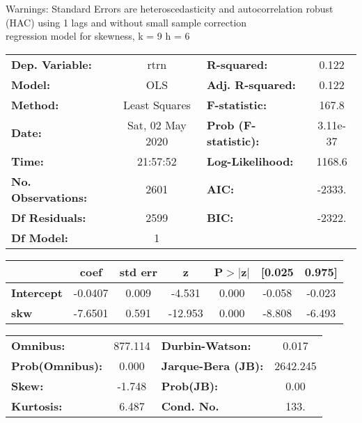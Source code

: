 Warnings: \newline
 [1] Standard Errors are heteroscedasticity and autocorrelation robust (HAC) using 1 lags and without small sample correction\\ 

regression model for skewness, k = 9 h = 6\begin{center}
\begin{tabular}{lclc}
\toprule
\textbf{Dep. Variable:}    &       rtrn       & \textbf{  R-squared:         } &     0.122   \\
\textbf{Model:}            &       OLS        & \textbf{  Adj. R-squared:    } &     0.122   \\
\textbf{Method:}           &  Least Squares   & \textbf{  F-statistic:       } &     167.8   \\
\textbf{Date:}             & Sat, 02 May 2020 & \textbf{  Prob (F-statistic):} &  3.11e-37   \\
\textbf{Time:}             &     21:57:52     & \textbf{  Log-Likelihood:    } &    1168.6   \\
\textbf{No. Observations:} &        2601      & \textbf{  AIC:               } &    -2333.   \\
\textbf{Df Residuals:}     &        2599      & \textbf{  BIC:               } &    -2322.   \\
\textbf{Df Model:}         &           1      & \textbf{                     } &             \\
\bottomrule
\end{tabular}
\begin{tabular}{lcccccc}
                   & \textbf{coef} & \textbf{std err} & \textbf{z} & \textbf{P$> |$z$|$} & \textbf{[0.025} & \textbf{0.975]}  \\
\midrule
\textbf{Intercept} &      -0.0407  &        0.009     &    -4.531  &         0.000        &       -0.058    &       -0.023     \\
\textbf{skw}       &      -7.6501  &        0.591     &   -12.953  &         0.000        &       -8.808    &       -6.493     \\
\bottomrule
\end{tabular}
\begin{tabular}{lclc}
\textbf{Omnibus:}       & 877.114 & \textbf{  Durbin-Watson:     } &    0.017  \\
\textbf{Prob(Omnibus):} &   0.000 & \textbf{  Jarque-Bera (JB):  } & 2642.245  \\
\textbf{Skew:}          &  -1.748 & \textbf{  Prob(JB):          } &     0.00  \\
\textbf{Kurtosis:}      &   6.487 & \textbf{  Cond. No.          } &     133.  \\
\bottomrule
\end{tabular}
\end{center}

